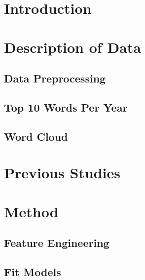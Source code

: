 \documentclass[12pt]{article}
\begin{document}
\newpage
\tableofcontents
\newpage
\section{Introduction} \label{sec:Intro}



\section{Description of Data} \label{sec:Descript}

\subsection{Data Preprocessing}



\subsection{Top 10 Words Per Year}



\subsection{Word Cloud}



\section{Previous Studies}


\section{Method}

\subsection{Feature Engineering}


\subsection{Fit Models}
\end{document}
